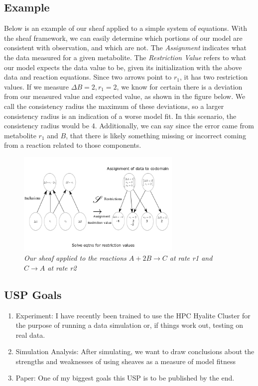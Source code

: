 \documentclass[10.5pt]{article}
\begin{document}
\subsection{Example}
Below is an example of our sheaf applied to a simple system of equations. With 
the sheaf framework, we can easily determine which portions of our model are 
consistent with observation, and which are not. The \textit{Assignment} 
indicates what the data measured for a given metabolite. The 
\textit{Restriction Value} refers to what our model expects the data value to 
be, given its initialization with the above data and reaction equations. Since 
two arrows point to $r_1$, it has two restriction values. If we measure $\Delta 
B = 2, r_1=2$, we know for certain there is a deviation from our measured value 
and expected value, as shown in the figure below. We call the consistency 
radius the maximum of these deviations, so a larger consistency radius is an 
indication of a worse model fit. In this scenario, the consistency radius would 
be 4. Additionally, we can say since the error came from metabolite $r_1$ and 
$B$, that there is likely something missing or incorrect coming from a reaction 
related to those components.
\begin{figure}[h]
	\caption{\textit{Our sheaf applied to the reactions $A + 2B\rightarrow C$ at rate r1 and $C \rightarrow A$ at rate r2}}
	
	\centering
	\includegraphics[width=0.7\textwidth, 
	height=0.25\textheight]{examplemapping}
\end{figure}
\subsection{USP Goals}
\begin{enumerate}
	\item Experiment:
	I have recently been trained to use the HPC Hyalite Cluster for the purpose 
	of running a data simulation or, if things work out, testing on real data. 
	\item Simulation Analysis: After simulating, we want to draw conclusions 
	about the strengths and weaknesses of using sheaves as a measure of model 
	fitness
	\item Paper: One of my biggest goals this USP is to be published by the 
	end. 

\end{enumerate}
\end{document}
